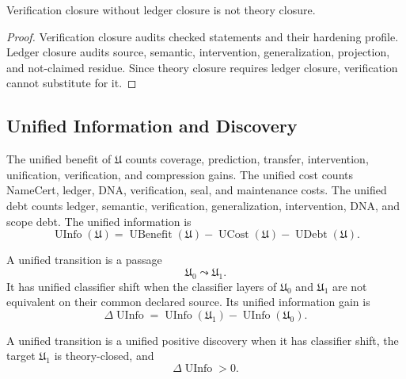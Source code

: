 \begin{theorem}
\label{thm:philosophy-verification-does-not-replace-ledger-closure}
Verification closure without ledger closure is not theory closure.
\end{theorem}
\begin{proof}
Verification closure audits checked statements and their hardening
profile. Ledger closure audits source, semantic, intervention,
generalization, projection, and not-claimed residue. Since theory closure
requires ledger closure, verification cannot substitute for it.
\end{proof}

\subsection{Unified Information and Discovery}
\label{subsec:philosophy-unified-information-discovery}

\begin{definition}
\label{def:philosophy-unified-information}
The unified benefit of $\mathfrak U$ counts coverage, prediction,
transfer, intervention, unification, verification, and compression gains.
The unified cost counts NameCert, ledger, DNA, verification, seal, and
maintenance costs. The unified debt counts ledger, semantic,
verification, generalization, intervention, DNA, and scope debt. The
unified information is
$$
\operatorname{UInfo}(\mathfrak U)
=
\operatorname{UBenefit}(\mathfrak U)
-
\operatorname{UCost}(\mathfrak U)
-
\operatorname{UDebt}(\mathfrak U).
$$
\end{definition}

\begin{definition}
\label{def:philosophy-unified-transition-classifier-shift}
A unified transition is a passage
$$
\mathfrak U_0\leadsto\mathfrak U_1.
$$
It has unified classifier shift when the classifier layers of
$\mathfrak U_0$ and $\mathfrak U_1$ are not equivalent on their common
declared source. Its unified information gain is
$$
\Delta\operatorname{UInfo}
=
\operatorname{UInfo}(\mathfrak U_1)
-
\operatorname{UInfo}(\mathfrak U_0).
$$
\end{definition}

\begin{definition}
\label{def:philosophy-unified-positive-discovery}
A unified transition is a unified positive discovery when it has
classifier shift, the target $\mathfrak U_1$ is theory-closed, and
$$
\Delta\operatorname{UInfo}>0.
$$
\end{definition}

